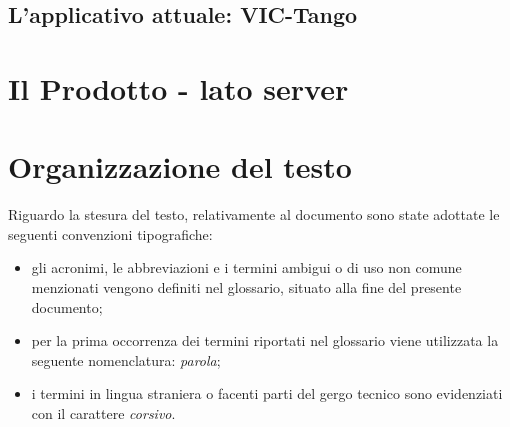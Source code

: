 \subsection{L'applicativo attuale: VIC-Tango}

\section{Il Prodotto - lato server}



\section{Organizzazione del testo}
Riguardo la stesura del testo, relativamente al documento sono state adottate le seguenti convenzioni tipografiche:
\begin{itemize}
	\item gli acronimi, le abbreviazioni e i termini ambigui o di uso non comune menzionati vengono definiti nel glossario, situato alla fine del presente documento;
	\item per la prima occorrenza dei termini riportati nel glossario viene utilizzata la seguente nomenclatura: \emph{parola}\glsfirstoccur;
	\item i termini in lingua straniera o facenti parti del gergo tecnico sono evidenziati con il carattere \emph{corsivo}.
\end{itemize}